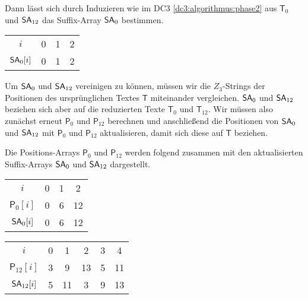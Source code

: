Dann lässt sich durch Induzieren wie im DC3 \cref{dc3:algorithmus:phase2} aus $\mathsf{T}_{0}$ und $\sa_{12}$ das Suffix-Array $\sa_0$ bestimmen.

\begin{table}[H]
	\footnotesize
	\centering
	\begin{tabular}{c| c c c }
		$i$ & 0 & 1 & 2 \\
		$\sa_0[i]$ & 0 & 1 & 2 
	\end{tabular}
\end{table}

Um $\sa_0$ und $\sa_{12}$ vereinigen zu können, müssen wir die $Z_3$-Strings der Positionen des ursprünglichen Textes $\mathsf{T}$ miteinander vergleichen. $\sa_0$ und $\sa_{12}$ beziehen sich aber auf die reduzierten Texte $\mathsf{T}_{0}$ und $\mathsf{T}_{12}$. Wir müssen also zunächst erneut $\mathsf{P}_0$ und $\mathsf{P}_{12}$ berechnen und anschließend die Positionen von $\sa_0$ und $\sa_{12}$ mit $\mathsf{P}_0$ und $\mathsf{P}_{12}$ aktualisieren, damit sich diese auf $\mathsf{T}$ beziehen. \par
Die Positions-Arrays $\mathsf{P}_0$ und $\mathsf{P}_{12}$ werden folgend zusammen mit den aktualisierten Suffix-Arrays $\sa_0$ und $\sa_{12}$ dargestellt. 

\begin{table}[H]
	\footnotesize
	\centering
	\begin{tabular}{c| c c c }
		$i$ & 0 & 1 & 2 \\
		$\mathsf{P}_0[i]$ & 0 & 6 & 12 \\
		$\sa_0[i]$ & 0 & 6 & 12 
	\end{tabular}
\end{table}
\begin{table}[H]
	\footnotesize
	\centering
	\begin{tabular}{c| c c c c c }
		$i$ & 0 & 1 & 2 & 3 & 4 \\
		$\mathsf{P}_{12}[i]$ & 3 & 9 & 13 & 5 & 11 \\
		$\sa_{12}[i]$ & 5 & 11 & 3 & 9 & 13 
	\end{tabular}
\end{table}

